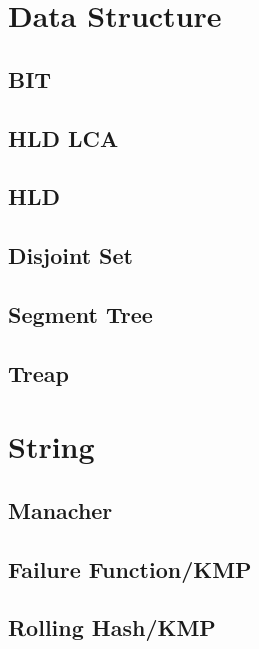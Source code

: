 \section{Data Structure}
	\subsection{BIT}
		
	\subsection{HLD LCA}
		
	\subsection{HLD}
		
	\subsection{Disjoint Set}
		
	\subsection{Segment Tree}
		
	\subsection{Treap}
		
\section{String}
	\subsection{Manacher}
		
	\subsection{Failure Function/KMP}
		
	\subsection{Rolling Hash/KMP}
		